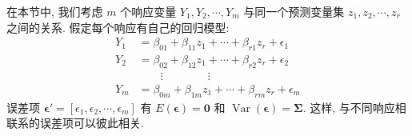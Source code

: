 在本节中, 我们考虑 $m$ 个响应变量 $Y_1,Y_2,\cdots,Y_m$ 与同一个预测变量集 $z_1,z_2,\cdots,z_r$ 之间的关系. 假定每个响应有自己的回归模型:
\label{eq:7-22}
\begin{equation}
\begin{aligned}
Y_1&=\beta_{01}+\beta_{11}z_1+\cdots+\beta_{r1}z_r+\epsilon_1\\
Y_2&=\beta_{02}+\beta_{12}z_1+\cdots+\beta_{r2}z_r+\epsilon_2\\
&\qquad\vdots\qquad\qquad\vdots\\
Y_m&=\beta_{0m}+\beta_{1m}z_1+\cdots+\beta_{rm}z_r+\epsilon_m
\end{aligned} \tag{7-22}
\end{equation}
误差项 $\boldsymbol{\epsilon}'=[\epsilon_1,\epsilon_2,\cdots,\epsilon_m]$ 有 $E(\boldsymbol{\epsilon})=\mathbf{0}$ 和 $\operatorname{Var}(\boldsymbol{\epsilon})=\boldsymbol{\Sigma}$. 这样, 与不同响应相联系的误差项可以彼此相关.
